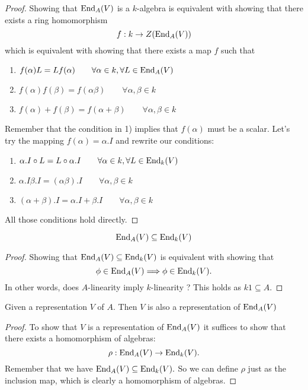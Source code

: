 \begin{proof}
Showing that \(\operatorname{End}_A(V)\) is a \(k\)-algebra is equivalent with showing that there exists a ring homomorphism
\[
f: k \rightarrow  Z(\operatorname{End}_A(V))
\]
which is equivalent with showing that there exists a map \(f\) such that

\begin{enumerate}
  \item \(f(\alpha )L=Lf(\alpha ) \qquad \forall \alpha \in k,\forall L\in \operatorname{End}_A(V)\)
  \item \(f(\alpha )f(\beta )=f(\alpha \beta ) \qquad \forall \alpha ,\beta \in k\)
  \item \(f(\alpha )+f(\beta )=f(\alpha +\beta ) \qquad \forall \alpha ,\beta \in k\)
\end{enumerate}

Remember that the condition in 1) implies that \(f(\alpha )\) must be a scalar. Let's try the mapping \(f(\alpha )=\alpha .I\) and rewrite our conditions:

\begin{enumerate}
  \item \(\alpha .I\circ L=L\circ \alpha .I \qquad \forall \alpha \in k,\forall L\in \operatorname{End}_{k}(V)\)
  \item \(\alpha .I\beta .I=(\alpha \beta ).I \qquad \forall \alpha ,\beta \in k\)
  \item \((\alpha +\beta ).I=\alpha .I+\beta .I \qquad \forall \alpha ,\beta \in k\)
\end{enumerate}

All those conditions hold directly.
\end{proof}

\begin{prop}
\[
\operatorname{End}_A(V)\subseteq \operatorname{End}_{k}(V)
\]
\end{prop}

\begin{proof}
Showing that \(\operatorname{End}_A(V)\subseteq \operatorname{End}_{k}(V)\) is equivalent with showing that
\[
\phi \in \operatorname{End}_A(V) \Longrightarrow  \phi \in  \operatorname{End}_{k}(V).
\]
In other words, does \(A\)-linearity imply \(k\)-linearity ? This holds as \(k1\subseteq A\).
\end{proof}

\begin{prop}
Given a representation \(V\) of \(A\). Then \(V\) is also a representation of \(\operatorname{End}_A(V)\)
\end{prop}

\begin{proof}
To show that \(V\) is a representation of \(\operatorname{End}_A(V)\) it suffices to show that there exists a homomorphism of algebras:
\[
\rho :\operatorname{End}_A(V)\rightarrow \operatorname{End}_{k}(V).
\]
Remember that we have \(\operatorname{End}_A(V)\subseteq \operatorname{End}_{k}(V).\) So we can define \(\rho \) just as the inclusion map, which is clearly a homomorphism of algebras.
\end{proof}

